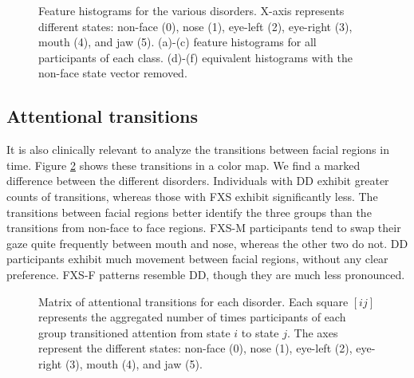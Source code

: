\documentclass[10pt,twocolumn,letterpaper]{article}
\begin{document}
\begin{figure}
\caption{Feature histograms for the various disorders. X-axis represents different states: non-face (0), nose (1), eye-left (2), eye-right (3), mouth (4), and jaw (5). (a)-(c) feature histograms for all participants of each class. (d)-(f) equivalent histograms with the non-face state vector removed.}
\label{fig:histo}
\end{figure}


\subsection{Attentional transitions}
It is also clinically relevant to analyze the transitions between facial regions in time. Figure \ref{fig:transitions} shows these transitions in a color map. We find a marked difference between the different disorders. Individuals with DD exhibit greater counts of transitions, whereas those with FXS exhibit significantly less. The transitions between facial regions better identify the three groups than the transitions from non-face to face regions. FXS-M participants tend to swap their gaze quite frequently between mouth and nose, whereas the other two do not. DD participants exhibit much movement between facial regions, without any clear preference. FXS-F patterns resemble DD, though they are much less pronounced.

\begin{figure}[b]
               \hfill   
               \hfill
\caption{Matrix of attentional transitions for each disorder. Each square $[ij]$ represents the aggregated number of times participants of each group transitioned attention from state $i$ to state $j$.  The axes represent the different states: non-face (0), nose (1), eye-left (2), eye-right (3), mouth (4), and jaw (5).}
\label{fig:transitions}
\end{figure}
\end{document}
